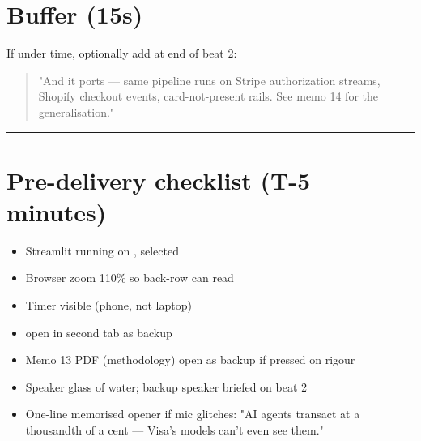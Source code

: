 \documentclass[11pt]{article}
\begin{document}
\section{Buffer (15s)}
If under time, optionally add at end of beat 2:

\begin{quote}
"And it ports --- same pipeline runs on Stripe authorization streams, Shopify checkout events, card-not-present rails. See memo 14 for the generalisation."
\end{quote}
\medskip\hrule\medskip
\section{Pre-delivery checklist (T-5 minutes)}
\begin{itemize}
  \item [ ] Streamlit running on ,  selected
  \item [ ] Browser zoom 110\% so back-row can read
  \item [ ] Timer visible (phone, not laptop)
  \item [ ]  open in second tab as backup
  \item [ ] Memo 13 PDF (methodology) open as backup if pressed on rigour
  \item [ ] Speaker glass of water; backup speaker briefed on beat 2
  \item [ ] One-line memorised opener if mic glitches: "AI agents transact at a thousandth of a cent --- Visa's models can't even see them."
\end{itemize}
\end{document}
